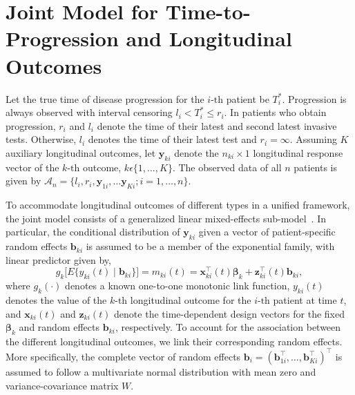 \section{Joint Model for Time-to-Progression and Longitudinal Outcomes}
\label{sec:jointmodel}
Let the true time of disease progression for the ${i\mbox{-th}}$ patient be $T_i^*$. Progression is always observed with interval censoring ${l_i < T_i^* \leq r_i}$. In patients who obtain progression, $r_i$ and $l_i$ denote the time of their latest and second latest invasive tests. Otherwise, $l_i$ denotes the time of their latest test and ${r_i=\infty}$. Assuming $K$ auxiliary longitudinal outcomes, let $\boldsymbol{y}_{ki}$ denote the ${n_{ki} \times 1}$ longitudinal response vector of the ${k\mbox{-th}}$ outcome, $k\epsilon\{1, \ldots, K\}$. The observed data of all $n$ patients is given by ${\mathcal{A}_n = \{l_i, r_i, \boldsymbol{y}_{1i},\ldots \boldsymbol{y}_{Ki}; i = 1, \ldots, n\}}$.

To accommodate longitudinal outcomes of different types in a unified framework, the joint model consists of a generalized linear mixed-effects sub-model~\citep{laird1982random}. In particular, the conditional
distribution of $\boldsymbol{y}_{ki}$ given a vector of patient-specific random effects $\boldsymbol{b}_{ki}$ is assumed to be a member of the exponential family, with linear predictor given by,
\begin{equation}
\label{eq:long_model}
g_k\big[E\{y_{ki} (t) \mid \boldsymbol{b}_{ki}\}\big] = m_{ki}(t) = \boldsymbol{x}_{ki}^{\top}(t)\boldsymbol{\beta}_{k} + \boldsymbol{z}_{ki}^{\top}(t)\boldsymbol{b}_{ki},
\end{equation}
where $g_k(\cdot)$ denotes a known one-to-one monotonic link function, $y_{ki}(t)$ denotes the
value of the ${k\mbox{-th}}$ longitudinal outcome for the ${i\mbox{-th}}$ patient at time $t$, and $\boldsymbol{x}_{ki}(t)$ and $\boldsymbol{z}_{ki}(t)$ denote the time-dependent design vectors for the fixed $\boldsymbol{\beta}_{k}$ and random effects $\boldsymbol{b}_{ki}$, respectively. To account for the association between the different longitudinal outcomes, we link their corresponding random effects. More specifically, the complete vector of random effects ${\boldsymbol{b}_{i} = (\boldsymbol{b}_{1i}^{\top}, \ldots, \boldsymbol{b}_{Ki}^{\top})^{\top}}$ is assumed to follow a multivariate normal distribution with mean zero and variance-covariance matrix $W$.

